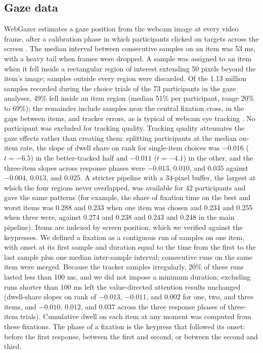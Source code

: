 \documentclass[10pt,letterpaper]{article}
\begin{document}
\subsection*{Gaze data}\label{gaze-data}

WebGazer estimates a gaze position from the webcam image at every video
frame, after a calibration phase in which participants clicked on
targets across the screen \cite{papoutsaki2016,yang2021}. The median
interval between consecutive samples on an item was 53 ms, with a heavy
tail when frames were dropped. A sample was assigned to an item when it
fell inside a rectangular region of interest extending 50 pixels beyond
the item's image; samples outside every region were discarded. Of the
1.13 million samples recorded during the choice trials of the 73
participants in the gaze analyses, 49\% fell inside an item region
(median 51\% per participant, range 20\% to 69\%); the remainder include
samples near the central fixation cross, in the gaps between items, and
tracker errors, as is typical of webcam eye tracking
\cite{yang2021,semmelmann2018}. No participant was excluded for tracking
quality. Tracking quality attenuates the gaze effects rather than
creating them: splitting participants at the median on-item rate, the
slope of dwell share on rank for single-item choices was \(-0.016\)
(\(t = -6.5\)) in the better-tracked half and \(-0.011\) (\(t = -4.1\))
in the other, and the three-item slopes across response phases were
\(-0.013\), \(0.010\), and \(0.035\) against \(-0.004\), \(0.013\), and
\(0.025\). A stricter pipeline with a 34-pixel buffer, the largest at
which the four regions never overlapped, was available for 42
participants and gave the same patterns (for example, the share of
fixation time on the best and worst items was 0.288 and 0.233 when one
item was chosen and 0.234 and 0.255 when three were, against 0.274 and
0.238 and 0.243 and 0.248 in the main pipeline). Items are indexed by
screen position, which we verified against the keypresses. We defined a
fixation as a contiguous run of samples on one item, with onset at its
first sample and duration equal to the time from the first to the last
sample plus one median inter-sample interval; consecutive runs on the
same item were merged. Because the tracker samples irregularly, 20\% of
these runs lasted less than 100 ms, and we did not impose a minimum
duration; excluding runs shorter than 100 ms left the value-directed
attention results unchanged (dwell-share slopes on rank of \(-0.013\),
\(-0.011\), and \(0.002\) for one, two, and three items, and \(-0.010\),
\(0.012\), and \(0.037\) across the three response phases of three-item
trials). Cumulative dwell on each item at any moment was computed from
these fixations. The phase of a fixation is the keypress that followed
its onset: before the first response, between the first and second, or
between the second and third.
\end{document}
